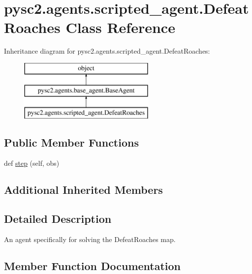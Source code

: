 \hypertarget{classpysc2_1_1agents_1_1scripted__agent_1_1_defeat_roaches}{}\section{pysc2.\+agents.\+scripted\+\_\+agent.\+Defeat\+Roaches Class Reference}
\label{classpysc2_1_1agents_1_1scripted__agent_1_1_defeat_roaches}
Inheritance diagram for pysc2.\+agents.\+scripted\+\_\+agent.\+Defeat\+Roaches\+:\begin{figure}[H]
\begin{center}
\leavevmode
\includegraphics[height=3.000000cm]{classpysc2_1_1agents_1_1scripted__agent_1_1_defeat_roaches}
\end{center}
\end{figure}
\subsection*{Public Member Functions}
\begin{DoxyCompactItemize}
\item 
def \mbox{\hyperlink{classpysc2_1_1agents_1_1scripted__agent_1_1_defeat_roaches_a681a94d365c4725ba8fa30bbc682e4ac}{step}} (self, obs)
\end{DoxyCompactItemize}
\subsection*{Additional Inherited Members}


\subsection{Detailed Description}
\begin{DoxyVerb}An agent specifically for solving the DefeatRoaches map.\end{DoxyVerb}
 

\subsection{Member Function Documentation}
\mbox{\label{classpysc2_1_1agents_1_1scripted__agent_1_1_defeat_roaches_a681a94d365c4725ba8fa30bbc682e4ac}} 
